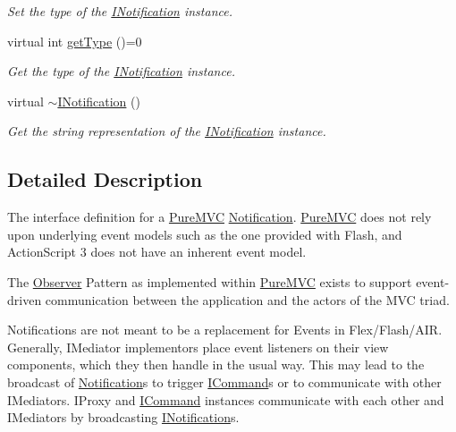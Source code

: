 \begin{DoxyCompactItemize}
\begin{DoxyCompactList}\small\item\em Set the type of the {\ttfamily \hyperlink{class_pure_m_v_c_1_1_i_notification}{INotification}} instance. \item\end{DoxyCompactList}\item 
virtual int \hyperlink{class_pure_m_v_c_1_1_i_notification_a40c8210a691d342cedcb558beef3ef52}{getType} ()=0
\begin{DoxyCompactList}\small\item\em Get the type of the {\ttfamily \hyperlink{class_pure_m_v_c_1_1_i_notification}{INotification}} instance. \item\end{DoxyCompactList}\item 
virtual \hyperlink{class_pure_m_v_c_1_1_i_notification_ac0b60e01d714dc0f765cedd530631173}{$\sim$INotification} ()
\begin{DoxyCompactList}\small\item\em Get the string representation of the {\ttfamily \hyperlink{class_pure_m_v_c_1_1_i_notification}{INotification}} instance. \item\end{DoxyCompactList}\end{DoxyCompactItemize}


\subsection{Detailed Description}
The interface definition for a \hyperlink{namespace_pure_m_v_c}{PureMVC} \hyperlink{class_pure_m_v_c_1_1_notification}{Notification}. \hyperlink{namespace_pure_m_v_c}{PureMVC} does not rely upon underlying event models such as the one provided with Flash, and ActionScript 3 does not have an inherent event model.

The \hyperlink{class_pure_m_v_c_1_1_observer}{Observer} Pattern as implemented within \hyperlink{namespace_pure_m_v_c}{PureMVC} exists to support event-\/driven communication between the application and the actors of the MVC triad.

Notifications are not meant to be a replacement for Events in Flex/Flash/AIR. Generally, {\ttfamily IMediator} implementors place event listeners on their view components, which they then handle in the usual way. This may lead to the broadcast of {\ttfamily \hyperlink{class_pure_m_v_c_1_1_notification}{Notification}}s to trigger {\ttfamily \hyperlink{class_pure_m_v_c_1_1_i_command}{ICommand}}s or to communicate with other {\ttfamily IMediators}. {\ttfamily IProxy} and {\ttfamily \hyperlink{class_pure_m_v_c_1_1_i_command}{ICommand}} instances communicate with each other and {\ttfamily IMediator}s by broadcasting {\ttfamily \hyperlink{class_pure_m_v_c_1_1_i_notification}{INotification}}s.

